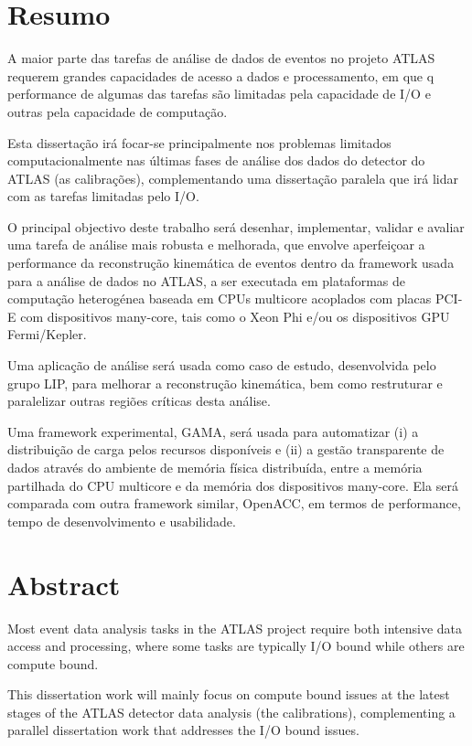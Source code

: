
\chapter*{Resumo}

A maior parte das tarefas de análise de dados de eventos no projeto ATLAS requerem grandes capacidades de acesso a dados e processamento, em que q performance de algumas das tarefas são limitadas pela capacidade de I/O e outras pela capacidade de computação.

Esta dissertação irá focar-se principalmente nos problemas limitados computacionalmente nas últimas fases de análise dos dados do detector do ATLAS (as calibrações), complementando uma dissertação paralela que irá lidar com as tarefas limitadas pelo I/O.

O principal objectivo deste trabalho será desenhar, implementar, validar e avaliar uma tarefa de análise mais robusta e melhorada, que envolve aperfeiçoar a performance da reconstrução kinemática de eventos dentro da framework usada para a análise de dados no ATLAS, a ser executada em plataformas de computação heterogénea baseada em CPUs multicore acoplados com placas PCI-E com dispositivos many-core, tais como o \intel Xeon Phi e/ou os dispositivos GPU \nvidia Fermi/Kepler.

Uma aplicação de análise será usada como caso de estudo, desenvolvida pelo grupo LIP, para melhorar a reconstrução kinemática, bem como restruturar e paralelizar outras regiões críticas desta análise.

Uma framework experimental, GAMA, será usada para automatizar (i) a distribuição de carga pelos recursos disponíveis e (ii) a gestão transparente de dados através do ambiente de memória física distribuída, entre a memória partilhada do CPU multicore e da memória dos dispositivos many-core. Ela será comparada com outra framework similar, OpenACC, em termos de performance, tempo de desenvolvimento e usabilidade.

\newpage {}
\chapter*{Abstract}

Most event data analysis tasks in the ATLAS project require both intensive data access and processing, where some tasks are typically I/O bound while others are compute bound.

This dissertation work will mainly focus on compute bound issues at the latest stages of the ATLAS detector data analysis (the calibrations), complementing a parallel dissertation work that addresses the I/O bound issues.

